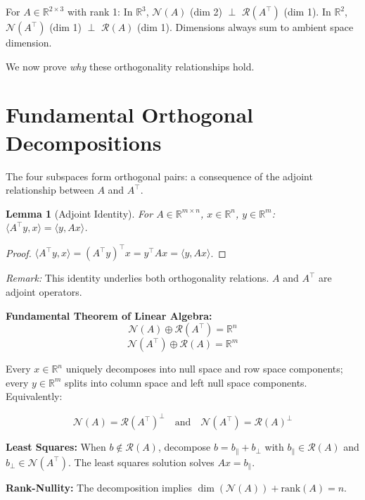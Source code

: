 \documentclass[10pt, twocolumn]{article}
\theoremstyle{definition}
\theoremstyle{plain}
\newtheorem{lemma}{Lemma}
\newcommand{\RR}{\mathbb{R}}
\newcommand{\NN}{\mathcal{N}}
\newcommand{\Range}{\mathcal{R}}
\begin{document}
\begin{tcolorbox}[colframe=black!50, title={\small Summary}]
For $A \in \RR^{2 \times 3}$ with rank 1: In $\RR^3$, $\NN(A)$ (dim 2) $\perp$ $\Range(A^\top)$ (dim 1). In $\RR^2$, $\NN(A^\top)$ (dim 1) $\perp$ $\Range(A)$ (dim 1). Dimensions always sum to ambient space dimension.
\end{tcolorbox}

We now prove \emph{why} these orthogonality relationships hold.

\section{Fundamental Orthogonal Decompositions}

The four subspaces form orthogonal pairs: a consequence of the adjoint relationship between $A$ and $A^\top$.

\begin{lemma}[Adjoint Identity]\label{lem:transpose-ip}
For $A \in \RR^{m \times n}$, $x \in \RR^n$, $y \in \RR^m$: \ $\langle A^\top y, x \rangle = \langle y, Ax \rangle$.
\end{lemma}

\begin{proof}
$\langle A^\top y, x \rangle = (A^\top y)^\top x = y^\top A x = \langle y, Ax \rangle$.
\end{proof}

\textit{Remark:} This identity underlies both orthogonality relations. $A$ and $A^\top$ are adjoint operators.

\begin{result}
\textbf{Fundamental Theorem of Linear Algebra:}
\[
    \NN(A) \oplus \Range(A^\top) = \RR^n
\]
\[
    \NN(A^\top) \oplus \Range(A) = \RR^m
\]
\end{result}

Every $x \in \RR^n$ uniquely decomposes into null space and row space components; every $y \in \RR^m$ splits into column space and left null space components. Equivalently:
\begin{result}
\[
    \NN(A) = \Range(A^\top)^\perp \quad \text{and} \quad \NN(A^\top) = \Range(A)^\perp
\]
\end{result}

\begin{tcolorbox}[colframe=black!50, title={\small Applications}]
\textbf{Least Squares:} When $b \notin \Range(A)$, decompose $b = b_{\parallel} + b_\perp$ with $b_{\parallel} \in \Range(A)$ and $b_\perp \in \NN(A^\top)$. The least squares solution solves $Ax = b_{\parallel}$.

\textbf{Rank-Nullity:} The decomposition implies $\dim(\NN(A)) + \text{rank}(A) = n$.
\end{tcolorbox}
\end{document}
